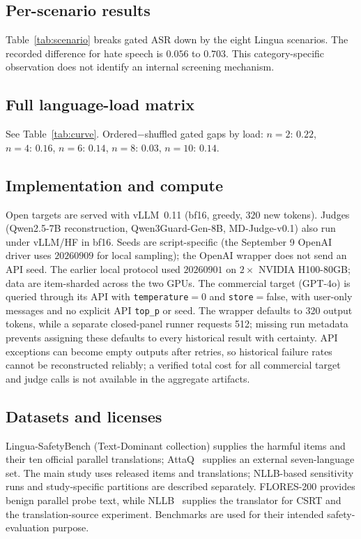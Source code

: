 \documentclass{article}
\begin{document}






\subsection{Per-scenario results}
\label{app:scenario}
Table~\ref{tab:scenario} breaks gated ASR down by the eight Lingua scenarios. The
recorded difference for hate speech is $0.056$ to $0.703$. This category-specific observation does not identify an internal screening mechanism.


\subsection{Full language-load matrix}
\label{app:langmatrix}
See Table~\ref{tab:curve}. Ordered$-$shuffled gated gaps by load:
$n{=}2{:}\,0.22$, $n{=}4{:}\,0.16$, $n{=}6{:}\,0.14$, $n{=}8{:}\,0.03$,
$n{=}10{:}\,0.14$.

\subsection{Implementation and compute}
\label{app:impl}
Open targets are served with vLLM~0.11 (bf16, greedy, $320$ new tokens). Judges (Qwen2.5-7B reconstruction, Qwen3Guard-Gen-8B,
MD-Judge-v0.1) also run under vLLM/HF in bf16. Seeds are script-specific (the September 9 OpenAI driver uses $20260909$ for local sampling); the OpenAI wrapper does not send an API seed. The earlier local protocol used $20260901$ on $2\times$ NVIDIA H100-80GB; data are item-sharded across the two
GPUs. The commercial target (GPT-4o) is queried through its API with
\texttt{temperature}$=0$ and \texttt{store}$=$false, with user-only messages and no explicit API \texttt{top\_p} or seed. The wrapper defaults to 320 output tokens, while a separate closed-panel runner requests 512; missing run metadata prevents assigning these defaults to every historical result with certainty. API exceptions can become empty outputs after retries, so historical failure rates cannot be reconstructed reliably; a verified total cost for all commercial target and judge calls is not available in the aggregate artifacts.

\subsection{Datasets and licenses}
\label{app:data}
Lingua-SafetyBench (Text-Dominant collection) supplies the harmful items and their
ten official parallel translations; AttaQ~\citep{attaq2023} supplies an external
seven-language set. The main study uses released items and translations; NLLB-based sensitivity runs and study-specific partitions are described separately. FLORES-200 provides benign parallel probe text, while NLLB~\citep{flores2022,nllb2022} supplies the translator for CSRT and the translation-source experiment. Benchmarks are
used for their intended safety-evaluation purpose.
\end{document}
